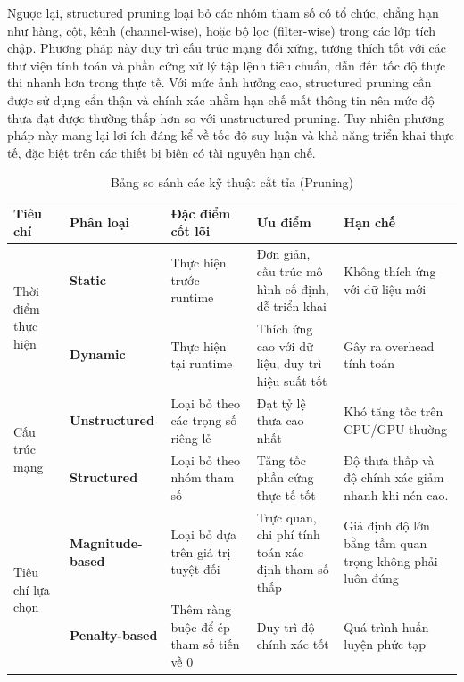 Ngược lại, structured pruning loại bỏ các nhóm tham số có tổ chức, chẳng hạn như hàng, cột, kênh (channel-wise), hoặc bộ lọc (filter-wise) trong các lớp tích chập. Phương pháp này duy trì cấu trúc mạng đối xứng, tương thích tốt với các thư viện tính toán và phần cứng xử lý tập lệnh tiêu chuẩn, dẫn đến tốc độ thực thi nhanh hơn trong thực tế. Với mức ảnh hưởng cao, structured pruning cần được sử dụng cẩn thận và chính xác nhằm hạn chế mất thông tin nên mức độ thưa đạt được thường thấp hơn so với unstructured pruning. Tuy nhiên phương pháp này mang lại lợi ích đáng kể về tốc độ suy luận và khả năng triển khai thực tế, đặc biệt trên các thiết bị biên có tài nguyên hạn chế.
\begin{table}[htbp]
\centering
\small
\begin{tabular}{|p{2cm} |p{2.5cm}|p{2.5cm} |p{2.5cm}|p{2.5cm}|}
\hline
\textbf{Tiêu chí} & \textbf{Phân loại} & \textbf{Đặc điểm cốt lõi} & \textbf{Ưu điểm} & \textbf{Hạn chế} \\ 
\hline
\multirow{2}{=}{Thời điểm thực hiện} & \textbf{Static} & Thực hiện trước runtime & Đơn giản, cấu trúc mô hình cố định, dễ triển khai & Không thích ứng với dữ liệu mới \\ \cline{2-5}
 & \textbf{Dynamic} & Thực hiện tại runtime & Thích ứng cao với dữ liệu, duy trì hiệu suất tốt & Gây ra overhead tính toán \\ 
\hline
\multirow{2}{=}{Cấu trúc mạng} & \textbf{Unstructured} & Loại bỏ theo các trọng số riêng lẻ & Đạt tỷ lệ thưa cao nhất & Khó tăng tốc trên CPU/GPU thường \\ \cline{2-5}
 & \textbf{Structured} & Loại bỏ theo nhóm tham số & Tăng tốc phần cứng thực tế tốt & Độ thưa thấp và độ chính xác giảm nhanh khi nén cao. \\ 
\hline
\multirow{2}{=}{Tiêu chí lựa chọn} & \textbf{Magnitude-based} & Loại bỏ dựa trên giá trị tuyệt đối & Trực quan, chi phí tính toán xác định tham số thấp & Giả định độ lớn bằng tầm quan trọng không phải luôn đúng \\ \cline{2-5}
 & \textbf{Penalty-based} & Thêm ràng buộc để ép tham số tiến về 0 & Duy trì độ chính xác tốt & Quá trình huấn luyện phức tạp \\ 
\hline
\end{tabular}
\caption{Bảng so sánh các kỹ thuật cắt tỉa (Pruning)}
\label{tab:pruning_comparison}
\end{table}

